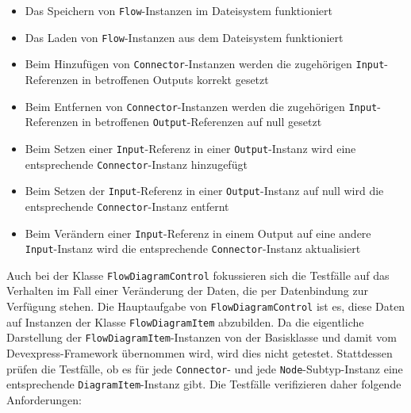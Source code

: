 \begin{itemize}
\item Das Speichern von \texttt{Flow}-Instanzen im Dateisystem funktioniert
\item Das Laden von \texttt{Flow}-Instanzen aus dem Dateisystem funktioniert
\item Beim Hinzufügen von \texttt{Connector}-Instanzen werden die zugehörigen \texttt{Input}-Referenzen in betroffenen Outputs korrekt gesetzt
\item Beim Entfernen von \texttt{Connector}-Instanzen werden die zugehörigen \texttt{Input}-Re\-fe\-ren\-zen in betroffenen \texttt{Output}-Referenzen auf null gesetzt
\item Beim Setzen einer \texttt{Input}-Referenz in einer \texttt{Output}-Instanz wird eine entsprechende \texttt{Connector}-Instanz hinzugefügt
\item Beim Setzen der \texttt{Input}-Referenz in einer \texttt{Output}-Instanz auf null wird die entsprechende \texttt{Connector}-Instanz entfernt
\item Beim Verändern einer \texttt{Input}-Referenz in einem Output auf eine andere \texttt{Input}-Instanz wird die entsprechende \texttt{Connector}-Instanz aktualisiert 
\end{itemize}

\noindent Auch bei der Klasse \texttt{FlowDiagramControl} fokussieren sich die Testfälle auf das Verhalten im Fall einer Veränderung der Daten, die per Datenbindung zur Verfügung stehen. Die Hauptaufgabe von \texttt{FlowDiagramControl} ist es, diese Daten auf Instanzen der Klasse \texttt{FlowDiagramItem} abzubilden. Da die eigentliche Darstellung der \texttt{FlowDiagramItem}-Instanzen von der Basisklasse und damit vom Devexpress-Framework übernommen wird, wird dies nicht getestet. Stattdessen prüfen die Testfälle, ob es für jede \texttt{Connector}- und jede \texttt{Node}-Subtyp-Instanz eine entsprechende \texttt{DiagramItem}-Instanz gibt. Die Testfälle verifizieren daher folgende Anforderungen:

